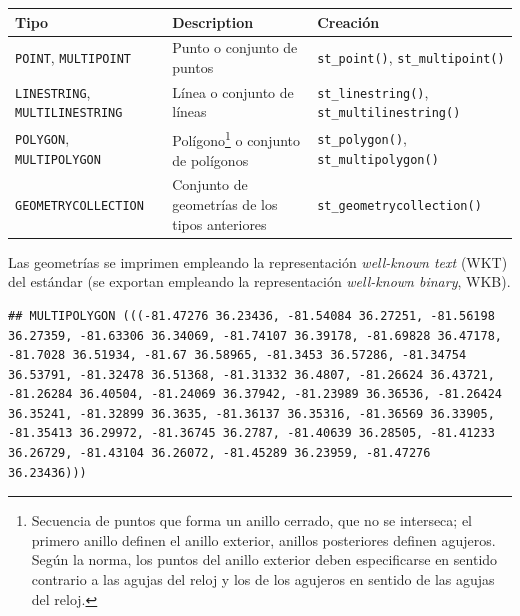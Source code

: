 \documentclass[
  spanish,
]{book}
\newenvironment{Shaded}{\begin{snugshade}}{\end{snugshade}}
\newcommand{\DecValTok}[1]{\textcolor[rgb]{0.00,0.00,0.81}{#1}}
\newcommand{\NormalTok}[1]{#1}
\newcommand{\SpecialCharTok}[1]{\textcolor[rgb]{0.00,0.00,0.00}{#1}}
\theoremstyle{break}
\theoremstyle{definition}
\theoremstyle{definition}
\theoremstyle{definition}
\theoremstyle{definition}
\theoremstyle{remark}
\begin{document}
\begin{longtable}[]{@{}
  >{\raggedright\arraybackslash}p{}
  >{\raggedright\arraybackslash}p{}
  >{\raggedright\arraybackslash}p{}@{}}
\toprule
Tipo & Description & Creación \\
\midrule
\endhead
\texttt{POINT}, \texttt{MULTIPOINT} & Punto o conjunto de puntos & \texttt{st\_point()}, \texttt{st\_multipoint()} \\
\texttt{LINESTRING}, \texttt{MULTILINESTRING} & Línea o conjunto de líneas & \texttt{st\_linestring()}, \texttt{st\_multilinestring()} \\
\texttt{POLYGON}, \texttt{MULTIPOLYGON} & Polígono\footnote{Secuencia de puntos que forma un anillo cerrado, que no se interseca; el primero anillo definen el anillo exterior, anillos posteriores definen agujeros. Según la norma, los puntos del anillo exterior deben especificarse en sentido contrario a las agujas del reloj y los de los agujeros en sentido de las agujas del reloj.} o conjunto de polígonos & \texttt{st\_polygon()}, \texttt{st\_multipolygon()} \\
\texttt{GEOMETRYCOLLECTION} & Conjunto de geometrías de los tipos anteriores & \texttt{st\_geometrycollection()} \\
\bottomrule
\end{longtable}

Las geometrías se imprimen empleando la representación \emph{well-known text} (WKT) del estándar (se exportan empleando la representación \emph{well-known binary}, WKB).

\begin{Shaded}
\end{Shaded}

\begin{verbatim}
## MULTIPOLYGON (((-81.47276 36.23436, -81.54084 36.27251, -81.56198 36.27359, -81.63306 36.34069, -81.74107 36.39178, -81.69828 36.47178, -81.7028 36.51934, -81.67 36.58965, -81.3453 36.57286, -81.34754 36.53791, -81.32478 36.51368, -81.31332 36.4807, -81.26624 36.43721, -81.26284 36.40504, -81.24069 36.37942, -81.23989 36.36536, -81.26424 36.35241, -81.32899 36.3635, -81.36137 36.35316, -81.36569 36.33905, -81.35413 36.29972, -81.36745 36.2787, -81.40639 36.28505, -81.41233 36.26729, -81.43104 36.26072, -81.45289 36.23959, -81.47276 36.23436)))
\end{verbatim}
\end{document}
